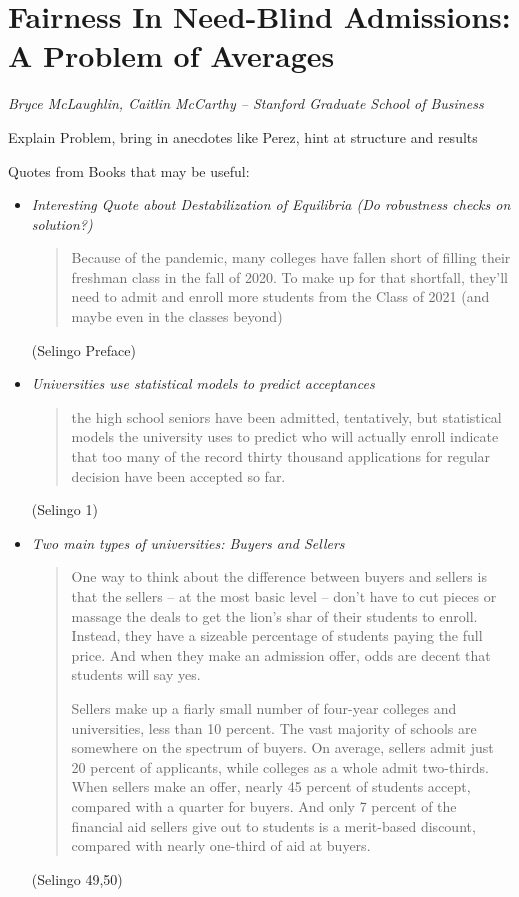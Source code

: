 \documentclass[10pt]{article}
\begin{document}
\section*{Fairness In Need-Blind Admissions: A Problem of Averages}

\textit{Bryce McLaughlin, Caitlin McCarthy -- Stanford Graduate School of Business}

\medskip

{\color{red} Explain Problem, bring in anecdotes like Perez, hint at structure and results}

{\color{blue} Quotes from Books that may be useful:

\begin{itemize}
	\item \textit{Interesting Quote about Destabilization of Equilibria (Do robustness checks on solution?)} 
	\begin{quote} Because of the pandemic, many colleges have fallen short of filling their freshman class in the fall of 2020. To make up for that shortfall, they'll need to admit and enroll more students from the Class of 2021 (and maybe even in the classes beyond)
	\end{quote} (Selingo Preface)
	\item \textit{Universities use statistical models to predict acceptances}
	\begin{quote}
	the high school seniors have been admitted, tentatively, but statistical models the university uses to predict who will actually enroll indicate that too many of the record thirty thousand applications for regular decision have been accepted so far.
	\end{quote}
	(Selingo 1)
	\item \textit{Two main types of universities: Buyers and Sellers}
	\begin{quote}
	One way to think about the difference between buyers and sellers is that the sellers -- at the most basic level -- don't have to cut pieces or massage the deals to get the lion's shar of their students to enroll. Instead, they have a sizeable percentage of students paying the full price. And when they make an admission offer, odds are decent that students will say yes.

	Sellers make up a fiarly small number of four-year colleges and universities, less than 10 percent. The vast majority of schools are somewhere on the spectrum of buyers. On average, sellers admit just 20 percent of applicants, while colleges as a whole admit two-thirds. When sellers make an offer, nearly 45 percent of students accept, compared with a quarter for buyers. And only 7 percent of the financial aid sellers give out to students is a merit-based discount, compared with nearly one-third of aid at buyers.
	\end{quote}
	(Selingo 49,50)
\end{itemize}}
\end{document}
